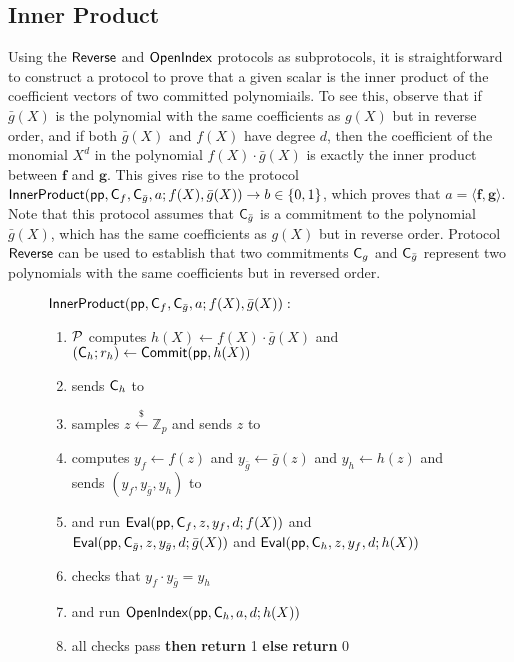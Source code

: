 \documentclass{article}
\theoremstyle{definition}
\begin{document}
\subsection{Inner Product}

Using the $\textsf{{Reverse}}$ and $\textsf{{OpenIndex}}$ protocols as subprotocols, it is straightforward to construct a protocol to prove that a given scalar is the inner product of the coefficient vectors of two committed polynomiails. To see this, observe that if $\bar{g}(X)$ is the polynomial with the same coefficients as $g(X)$ but in reverse order, and if both $\bar{g}(X)$ and $f(X)$ have degree $d$, then the coefficient of the monomial $X^d$ in the polynomial $f(X) \cdot \bar{g}(X)$ is exactly the inner product between $\mathbf{f}$ and $\mathbf{g}$. This gives rise to the protocol $\textsf{{InnerProduct}}(\textsf{pp}, \mathsf{C}_{f}, \mathsf{C}_{\bar{g}}, a; {f}(X), {\bar{g}}(X)) \rightarrow b \in \{0,1\}$, which proves that $a = \langle \mathbf{f}, \mathbf{g} \rangle$. Note that this protocol assumes that $\mathsf{C}_{\bar{g}}$ is a commitment to the polynomial $\bar{g}(X)$, which has the same coefficients as $g(X)$ but in reverse order. Protocol $\textsf{{Reverse}}$ can be used to establish that two commitments $\mathsf{C}_g$ and $\mathsf{C}_{\bar{g}}$ represent two polynomials with the same coefficients but in reversed order.

\begin{figure}[!htp]
\noindent\begin{mdframed}[userdefinedwidth=\textwidth]
\begin{minipage}{\textwidth}
	\begin{flushleft}
	$\textsf{{InnerProduct}}(\textsf{pp}, \mathsf{C}_{{f}}, \mathsf{C}_{\bar{g}}, a; f(X), \bar{g}(X)):$ 
		\begin{enumerate}[nolistsep]
		    \item $\mathcal{P}$ computes $h(X) \gets f(X) \cdot \bar{g}(X)$ and $(\mathsf{C}_h; r_h) \gets \textsf{{Commit}}(\textsf{pp}, h(X))$
		    \item \prover sends $\mathsf{C}_h$ to \verifier
		    \item \verifier samples $z \xleftarrow{\$} \mathbb{Z}_p$ and sends $z$ to \prover
		    \item \prover computes $y_f \gets f(z)$ and $y_{\bar{g}} \gets \bar{g}(z)$ and $y_h \gets h(z)$ and sends $(y_f, y_{\bar{g}}, y_h)$ to \verifier
		    \item \prover and \verifier run $\textsf{{Eval}}(\textsf{pp}, \mathsf{C}_f, z, y_f, d; f(X))$ and $\textsf{{Eval}}(\textsf{pp}, \mathsf{C}_{\bar{g}}, z, y_{\bar{g}}, d; \bar{g}(X))$ and $\textsf{{Eval}}(\textsf{pp}, \mathsf{C}_h, z, y_f, d; h(X))$
		    \item \verifier checks that $y_f \cdot y_{\bar{g}} = y_h$
		    \item \prover and \verifier run $\textsf{{OpenIndex}}(\textsf{pp}, \mathsf{C}_h, a, d; h(X))$
		    \item \pcif{}all checks pass \textbf{then} \textbf{return} 1 \textbf{else} \textbf{return} 0
		\end{enumerate}
	\end{flushleft}
\end{minipage}
\end{mdframed}
\end{figure}
\end{document}
